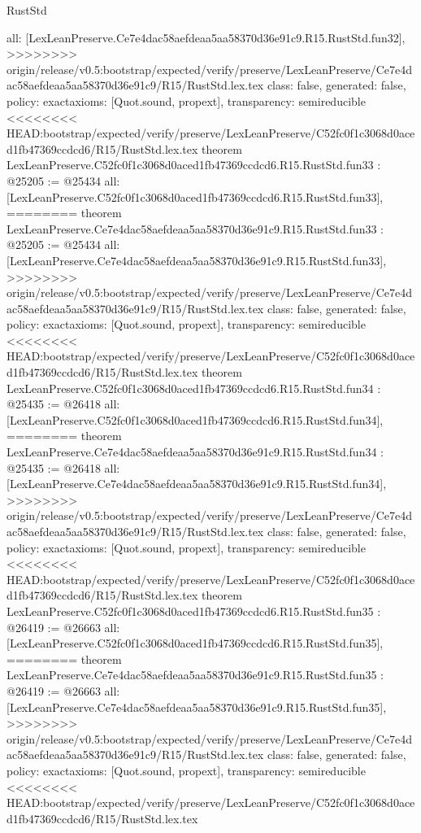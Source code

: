 \begin{lexlean}{RustStd}
\begin{coremodule}
{\begin{coremodule}
{{{{{{{{{{{{{{{{{{{{{{{{{{{{{{{{{{{{  all: [LexLeanPreserve.Ce7e4dac58aefdeaa5aa58370d36e91c9.R15.RustStd.fun32],
>>>>>>>> origin/release/v0.5:bootstrap/expected/verify/preserve/LexLeanPreserve/Ce7e4dac58aefdeaa5aa58370d36e91c9/R15/RustStd.lex.tex
  class: false,
  generated: false,
  policy: exact{axioms: [Quot.sound, propext]},
  transparency: semireducible
}
<<<<<<<< HEAD:bootstrap/expected/verify/preserve/LexLeanPreserve/C52fc0f1c3068d0aced1fb47369ccdcd6/R15/RustStd.lex.tex
theorem LexLeanPreserve.C52fc0f1c3068d0aced1fb47369ccdcd6.R15.RustStd.fun33 : @25205 := @25434 {
  all: [LexLeanPreserve.C52fc0f1c3068d0aced1fb47369ccdcd6.R15.RustStd.fun33],
========
theorem LexLeanPreserve.Ce7e4dac58aefdeaa5aa58370d36e91c9.R15.RustStd.fun33 : @25205 := @25434 {
  all: [LexLeanPreserve.Ce7e4dac58aefdeaa5aa58370d36e91c9.R15.RustStd.fun33],
>>>>>>>> origin/release/v0.5:bootstrap/expected/verify/preserve/LexLeanPreserve/Ce7e4dac58aefdeaa5aa58370d36e91c9/R15/RustStd.lex.tex
  class: false,
  generated: false,
  policy: exact{axioms: [Quot.sound, propext]},
  transparency: semireducible
}
<<<<<<<< HEAD:bootstrap/expected/verify/preserve/LexLeanPreserve/C52fc0f1c3068d0aced1fb47369ccdcd6/R15/RustStd.lex.tex
theorem LexLeanPreserve.C52fc0f1c3068d0aced1fb47369ccdcd6.R15.RustStd.fun34 : @25435 := @26418 {
  all: [LexLeanPreserve.C52fc0f1c3068d0aced1fb47369ccdcd6.R15.RustStd.fun34],
========
theorem LexLeanPreserve.Ce7e4dac58aefdeaa5aa58370d36e91c9.R15.RustStd.fun34 : @25435 := @26418 {
  all: [LexLeanPreserve.Ce7e4dac58aefdeaa5aa58370d36e91c9.R15.RustStd.fun34],
>>>>>>>> origin/release/v0.5:bootstrap/expected/verify/preserve/LexLeanPreserve/Ce7e4dac58aefdeaa5aa58370d36e91c9/R15/RustStd.lex.tex
  class: false,
  generated: false,
  policy: exact{axioms: [Quot.sound, propext]},
  transparency: semireducible
}
<<<<<<<< HEAD:bootstrap/expected/verify/preserve/LexLeanPreserve/C52fc0f1c3068d0aced1fb47369ccdcd6/R15/RustStd.lex.tex
theorem LexLeanPreserve.C52fc0f1c3068d0aced1fb47369ccdcd6.R15.RustStd.fun35 : @26419 := @26663 {
  all: [LexLeanPreserve.C52fc0f1c3068d0aced1fb47369ccdcd6.R15.RustStd.fun35],
========
theorem LexLeanPreserve.Ce7e4dac58aefdeaa5aa58370d36e91c9.R15.RustStd.fun35 : @26419 := @26663 {
  all: [LexLeanPreserve.Ce7e4dac58aefdeaa5aa58370d36e91c9.R15.RustStd.fun35],
>>>>>>>> origin/release/v0.5:bootstrap/expected/verify/preserve/LexLeanPreserve/Ce7e4dac58aefdeaa5aa58370d36e91c9/R15/RustStd.lex.tex
  class: false,
  generated: false,
  policy: exact{axioms: [Quot.sound, propext]},
  transparency: semireducible
}
<<<<<<<< HEAD:bootstrap/expected/verify/preserve/LexLeanPreserve/C52fc0f1c3068d0aced1fb47369ccdcd6/R15/RustStd.lex.tex
}}}}}}}}}}}}}}}}}}}}}}}}}}}}}}}}}}}}}}
\end{coremodule}}
\end{coremodule}
\end{lexlean}
